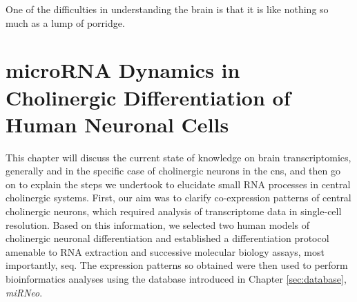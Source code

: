 
\begin{savequote}[70mm]
One of the difficulties in understanding the brain is that it is like nothing so much as a lump of porridge.
\end{savequote}

\chapter[microRNA Dynamics in Cholinergic Differentiation\texorpdfstring{\\}{} of Human Neuronal Cells]{microRNA Dynamics in Cholinergic Differentiation of Human Neuronal Cells}
This chapter will discuss the current state of knowledge on brain transcriptomics, generally and in the specific case of cholinergic neurons in the \ac{cns}, and then go on to explain the steps we undertook to elucidate small RNA processes in central cholinergic systems. First, our aim was to clarify co-expression patterns of central cholinergic neurons, which required analysis of transcriptome data in single-cell resolution. Based on this information, we selected two human models of cholinergic neuronal differentiation and established a differentiation protocol amenable to RNA extraction and successive molecular biology assays, most importantly, \ac{seq}. The expression patterns so obtained were then used to perform bioinformatics analyses using the database introduced in Chapter \ref{sec:database}, \textit{miRNeo}. 









